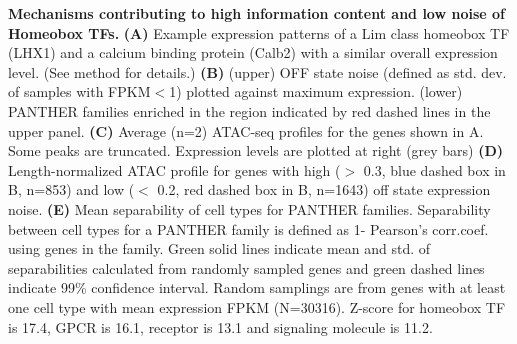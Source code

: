 \textbf{Mechanisms contributing to high information content and low noise of Homeobox TFs.}
\textbf{(A)} Example expression patterns of a Lim class homeobox TF (LHX1) and a calcium binding protein (Calb2) with a similar overall expression level. 
(See method for details.)
\textbf{(B)} (upper) OFF state noise (defined as std. dev. of samples with FPKM$<$1) plotted against maximum expression. (lower) PANTHER families enriched in the region indicated by red dashed lines in the upper panel.
\textbf{(C)} Average (n=2) ATAC-seq profiles for the genes shown in A. Some peaks are truncated. Expression levels are plotted at right (grey bars)
\textbf{(D)} Length-normalized ATAC profile for genes with high ($>$ 0.3, blue dashed box in B, n=853) and low ($<$ 0.2, red dashed box in B, n=1643) off state expression noise.
\textbf{(E)} Mean separability of cell types for PANTHER families. Separability between cell types for a PANTHER family is defined as 1- Pearson's corr.coef. using genes in the family. Green solid lines indicate mean and std. of separabilities calculated from randomly sampled genes and green dashed lines indicate 99\% confidence interval. Random samplings are from genes with at least one cell type with mean expression  FPKM (N=30316). Z-score for homeobox TF is 17.4, GPCR is 16.1, receptor is 13.1 and signaling molecule is 11.2. 
